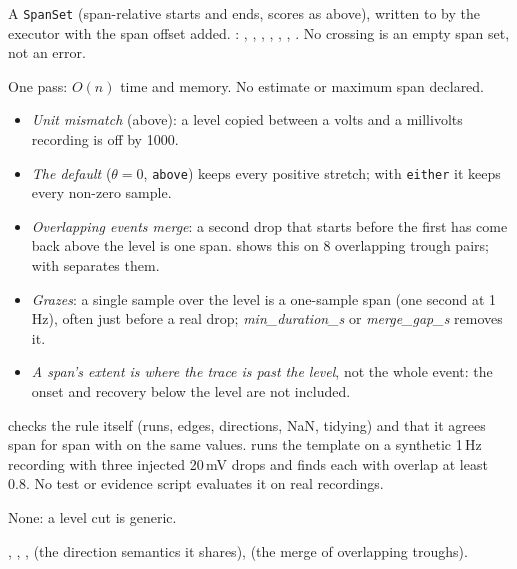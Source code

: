A \texttt{SpanSet} (span-relative starts and ends, scores as above), written to
 by the executor with the span offset added. : ,
, , , , ,
. No crossing is an empty span set, not an error.

One pass: $O(n)$ time and memory. No estimate or maximum span declared.

\begin{itemize}
\item \emph{Unit mismatch} (above): a level copied between a volts and a millivolts recording is
  off by 1000.
\item \emph{The default} ($\theta = 0$, \texttt{above}) keeps every positive stretch; with
  \texttt{either} it keeps every non-zero sample.
\item \emph{Overlapping events merge}: a second drop that starts before the first has come back
  above the level is one span.  shows this on 8
  overlapping trough pairs;  with
   separates them.
\item \emph{Grazes}: a single sample over the level is a one-sample span (one second at 1\,Hz),
  often just before a real drop; \emph{min\_duration\_s} or \emph{merge\_gap\_s} removes it.
\item \emph{A span's extent is where the trace is past the level}, not the whole event: the onset
  and recovery below the level are not included.
\end{itemize}

 checks the rule itself (runs, edges, directions,
NaN, tidying) and that it agrees span for span with  on the same
values.  runs the template on a synthetic 1\,Hz
recording with three injected 20\,mV drops and finds each with overlap at least 0.8. No test or
evidence script evaluates it on real recordings.

None: a level cut is generic.

, ,
,  (the
direction semantics it shares),  (the merge of
overlapping troughs).
